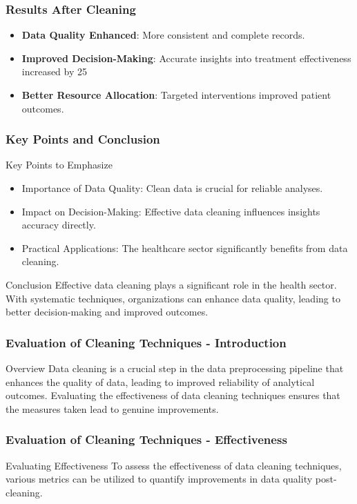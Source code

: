 \documentclass[aspectratio=169]{beamer}
\begin{document}
\begin{frame}[fragile]
    \frametitle{Results After Cleaning}
    \begin{itemize}
        \item \textbf{Data Quality Enhanced}: More consistent and complete records.
        \item \textbf{Improved Decision-Making}: Accurate insights into treatment effectiveness increased by 25%
        \item \textbf{Better Resource Allocation}: Targeted interventions improved patient outcomes.
    \end{itemize}
\end{frame}

\begin{frame}[fragile]
    \frametitle{Key Points and Conclusion}
    \begin{block}{Key Points to Emphasize}
        \begin{itemize}
            \item Importance of Data Quality: Clean data is crucial for reliable analyses.
            \item Impact on Decision-Making: Effective data cleaning influences insights accuracy directly.
            \item Practical Applications: The healthcare sector significantly benefits from data cleaning.
        \end{itemize}
    \end{block}
    \begin{block}{Conclusion}
        Effective data cleaning plays a significant role in the health sector. With systematic techniques, organizations can enhance data quality, leading to better decision-making and improved outcomes.
    \end{block}
\end{frame}

\begin{frame}[fragile]
    \frametitle{Evaluation of Cleaning Techniques - Introduction}
    \begin{block}{Overview}
        Data cleaning is a crucial step in the data preprocessing pipeline that enhances the quality of data, leading to improved reliability of analytical outcomes. Evaluating the effectiveness of data cleaning techniques ensures that the measures taken lead to genuine improvements.
    \end{block}
\end{frame}

\begin{frame}[fragile]
    \frametitle{Evaluation of Cleaning Techniques - Effectiveness}
    \begin{block}{Evaluating Effectiveness}
        To assess the effectiveness of data cleaning techniques, various metrics can be utilized to quantify improvements in data quality post-cleaning.
    \end{block}
\end{frame}
\end{document}
